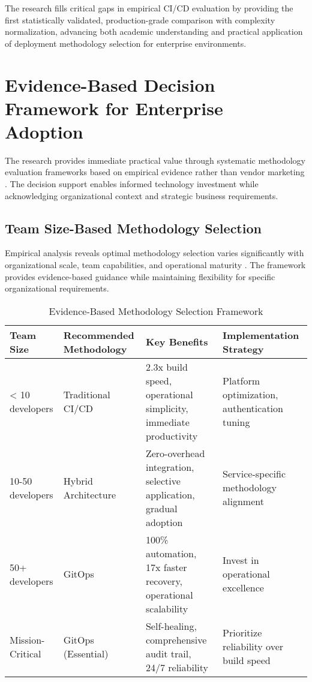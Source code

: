 The research fills critical gaps in empirical CI/CD evaluation by providing the first statistically validated, production-grade comparison with complexity normalization, advancing both academic understanding and practical application of deployment methodology selection for enterprise environments.

\section{Evidence-Based Decision Framework for Enterprise Adoption}
\label{sec:decision_framework}

The research provides immediate practical value through systematic methodology evaluation frameworks based on empirical evidence rather than vendor marketing \cite{strategic_technology_planning}. The decision support enables informed technology investment while acknowledging organizational context and strategic business requirements.

\subsection{Team Size-Based Methodology Selection}
\label{subsec:team_size_selection}

Empirical analysis reveals optimal methodology selection varies significantly with organizational scale, team capabilities, and operational maturity \cite{enterprise_technology_adoption}. The framework provides evidence-based guidance while maintaining flexibility for specific organizational requirements.

\begin{table}[H]
\centering
\caption{Evidence-Based Methodology Selection Framework}
\label{tab:methodology_selection_framework}
\begin{tabular}{|p{2.5cm}|p{2.8cm}|p{3.5cm}|p{4cm}|}
\hline
\textbf{Team Size} & \textbf{Recommended Methodology} & \textbf{Key Benefits} & \textbf{Implementation Strategy} \\
\hline
< 10 developers & Traditional CI/CD & 2.3x build speed, operational simplicity, immediate productivity & Platform optimization, authentication tuning \\
\hline
10-50 developers & Hybrid Architecture & Zero-overhead integration, selective application, gradual adoption & Service-specific methodology alignment \\
\hline
50+ developers & GitOps & 100\% automation, 17x faster recovery, operational scalability & Invest in operational excellence \\
\hline
Mission-Critical & GitOps (Essential) & Self-healing, comprehensive audit trail, 24/7 reliability & Prioritize reliability over build speed \\
\hline
\end{tabular}
\end{table}

